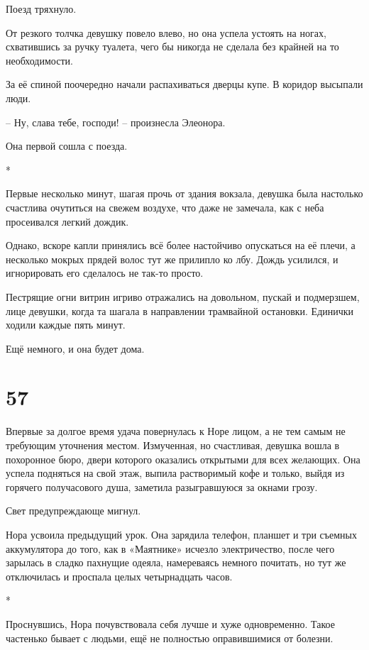 \documentclass[
  a5paperpaper,
  DIV=11,
  numbers=noendperiod]{scrreprt}
\begin{document}
Поезд тряхнуло.

От резкого толчка девушку повело влево, но она успела устоять на ногах,
схватившись за ручку туалета, чего бы никогда не сделала без крайней на
то необходимости.

За её спиной поочередно начали распахиваться дверцы купе. В коридор
высыпали люди.

-- Ну, слава тебе, господи! -- произнесла Элеонора.

Она первой сошла с поезда.

*

Первые несколько минут, шагая прочь от здания вокзала, девушка была
настолько счастлива очутиться на свежем воздухе, что даже не замечала,
как с неба просеивался легкий дождик.

Однако, вскоре капли принялись всё более настойчиво опускаться на её
плечи, а несколько мокрых прядей волос тут же прилипло ко лбу. Дождь
усилился, и игнорировать его сделалось не так-то просто.

Пестрящие огни витрин игриво отражались на довольном, пускай и
подмерзшем, лице девушки, когда та шагала в направлении трамвайной
остановки. Единички ходили каждые пять минут.

Ещё немного, и она будет дома.

\section*{57}\label{57}


Впервые за долгое время удача повернулась к Норе лицом, а не тем самым
не требующим уточнения местом. Измученная, но счастливая, девушка вошла
в похоронное бюро, двери которого оказались открытыми для всех желающих.
Она успела подняться на свой этаж, выпила растворимый кофе и только,
выйдя из горячего получасового душа, заметила разыгравшуюся за окнами
грозу.

Свет предупреждающе мигнул.

Нора усвоила предыдущий урок. Она зарядила телефон, планшет и три
съемных аккумулятора до того, как в «Маятнике» исчезло электричество,
после чего зарылась в сладко пахнущие одеяла, намереваясь немного
почитать, но тут же отключилась и проспала целых четырнадцать часов.

*

Проснувшись, Нора почувствовала себя лучше и хуже одновременно. Такое
частенько бывает с людьми, ещё не полностью оправившимися от болезни.
\end{document}
